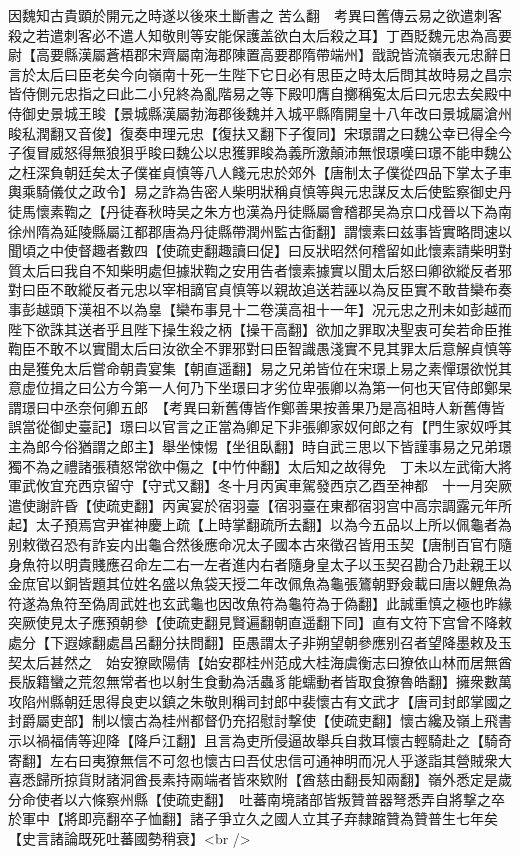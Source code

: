 因魏知古貴顕於開元之時遂以後來土斷書之苦么翻　考異曰舊傳云易之欲遣刺客殺之若遣刺客必不遣人知敬則等安能保護盖欲白太后殺之耳】丁酉貶魏元忠為高要尉【高要縣漢屬蒼梧郡宋齊屬南海郡陳置高要郡隋帶端州】戩說皆流嶺表元忠辭日言於太后曰臣老矣今向嶺南十死一生陛下它日必有思臣之時太后問其故時易之昌宗皆侍側元忠指之曰此二小兒終為亂階易之等下殿叩膺自擲稱寃太后曰元忠去矣殿中侍御史景城王睃【景城縣漢屬勃海郡後魏并入城平縣隋開皇十八年改曰景城屬滄州睃私潤翻又音俊】復奏申理元忠【復扶又翻下子復同】宋璟謂之曰魏公幸已得全今子復冒威怒得無狼狽乎睃曰魏公以忠獲罪睃為義所激顛沛無恨璟嘆曰璟不能申魏公之枉深負朝廷矣太子僕崔貞慎等八人餞元忠於郊外【唐制太子僕從四品下掌太子車輿乘騎儀仗之政令】易之詐為告密人柴明狀稱貞慎等與元忠謀反太后使監察御史丹徒馬懷素鞫之【丹徒春秋時吴之朱方也漢為丹徒縣屬會稽郡吴為京口戍晉以下為南徐州隋為延陵縣屬江都郡唐為丹徒縣帶潤州監古衘翻】謂懷素曰兹事皆實略問速以聞頃之中使督趣者數四【使疏吏翻趣讀曰促】曰反狀昭然何稽留如此懷素請柴明對質太后曰我自不知柴明處但據狀鞫之安用告者懷素據實以聞太后怒曰卿欲縱反者邪對曰臣不敢縱反者元忠以宰相謫官貞慎等以親故追送若誣以為反臣實不敢昔欒布奏事彭越頭下漢祖不以為辠【欒布事見十二卷漢高祖十一年】况元忠之刑未如彭越而陛下欲誅其送者乎且陛下操生殺之柄【操干高翻】欲加之罪取决聖衷可矣若命臣推鞫臣不敢不以實聞太后曰汝欲全不罪邪對曰臣智識愚淺實不見其罪太后意解貞慎等由是獲免太后嘗命朝貴宴集【朝直遥翻】易之兄弟皆位在宋璟上易之素憚璟欲悦其意虚位揖之曰公方今第一人何乃下坐璟曰才劣位卑張卿以為第一何也天官侍郎鄭杲謂璟曰中丞奈何卿五郎　【考異曰新舊傳皆作鄭善果按善果乃是高祖時人新舊傳皆誤當從御史臺記】璟曰以官言之正當為卿足下非張卿家奴何郎之有【門生家奴呼其主為郎今俗猶謂之郎主】舉坐悚惕【坐徂臥翻】時自武三思以下皆謹事易之兄弟璟獨不為之禮諸張積怒常欲中傷之【中竹仲翻】太后知之故得免　丁未以左武衛大將軍武攸宜充西京留守【守式又翻】冬十月丙寅車駕發西京乙酉至神都　十一月突厥遣使謝許昏【使疏吏翻】丙寅宴於宿羽臺【宿羽臺在東都宿羽宫中高宗調露元年所起】太子預焉宫尹崔神慶上疏【上時掌翻疏所去翻】以為今五品以上所以佩龜者為别敕徵召恐有詐妄内出龜合然後應命况太子國本古來徵召皆用玉契【唐制百官冇隨身魚符以明貴賤應召命左二右一左者進内右者隨身皇太子以玉契召勘合乃赴親王以金庶官以銅皆題其位姓名盛以魚袋天授二年改佩魚為龜張鷟朝野僉載曰唐以鯉魚為符遂為魚符至偽周武姓也玄武龜也因改魚符為龜符為于偽翻】此誠重慎之極也昨緣突厥使見太子應預朝參【使疏吏翻見賢遍翻朝直遥翻下同】直有文符下宫曾不降敕處分【下遐嫁翻處昌呂翻分扶問翻】臣愚謂太子非朔望朝參應别召者望降墨敕及玉契太后甚然之　始安獠歐陽倩【始安郡桂州范成大桂海虞衡志曰獠依山林而居無酋長版籍蠻之荒忽無常者也以射生食動為活蟲豸能蠕動者皆取食獠魯皓翻】擁衆數萬攻陷州縣朝廷思得良吏以鎮之朱敬則稱司封郎中裴懷古有文武才【唐司封郎掌國之封爵屬吏部】制以懷古為桂州都督仍充招慰討撃使【使疏吏翻】懷古纔及嶺上飛書示以禍福倩等迎降【降戶江翻】且言為吏所侵逼故舉兵自救耳懷古輕騎赴之【騎奇寄翻】左右曰夷獠無信不可忽也懷古曰吾仗忠信可通神明而况人乎遂詣其營賊衆大喜悉歸所掠貨財諸洞酋長素持兩端者皆來欵附【酋慈由翻長知兩翻】嶺外悉定是歲分命使者以六條察州縣【使疏吏翻】　吐蕃南境諸部皆叛贊普器弩悉弄自將撃之卒於軍中【將即亮翻卒子恤翻】諸子爭立久之國人立其子弃隸蹜贊為贊普生七年矣【史言諸論既死吐蕃國勢稍衰】<br />
